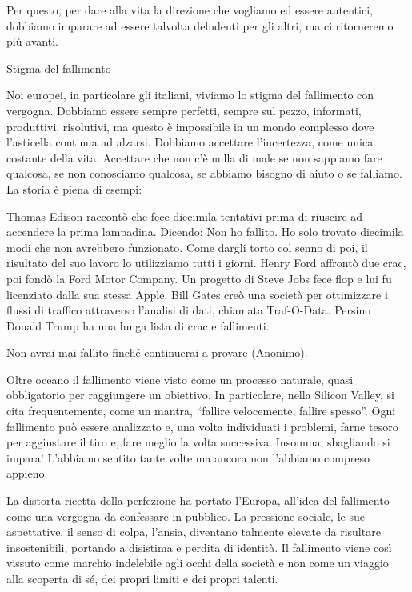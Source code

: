 \documentclass[12pt]{book} %
\begin{document}
Per questo, per dare alla vita la direzione che vogliamo ed essere autentici, dobbiamo imparare ad essere talvolta
deludenti per gli altri, ma ci ritorneremo più avanti.


\bigskip
\begin{mdframed}[linewidth=1pt]
Stigma del fallimento

Noi europei, in particolare gli italiani, viviamo lo stigma del fallimento con vergogna. Dobbiamo essere sempre
perfetti, sempre sul pezzo, informati, produttivi, risolutivi, ma questo è impossibile in un mondo complesso dove
l'asticella continua ad alzarsi. Dobbiamo accettare l'incertezza, come unica
costante della vita. Accettare che non c'è nulla di male se non sappiamo fare qualcosa, se non
conosciamo qualcosa, se abbiamo bisogno di aiuto o se falliamo. La storia è piena di esempi:

Thomas Edison raccontò che fece diecimila tentativi prima di riuscire ad accendere la prima lampadina. Dicendo: Non ho
fallito. Ho solo trovato diecimila modi che non avrebbero funzionato. Come dargli torto col senno di poi, il risultato
del suo lavoro lo utilizziamo tutti i giorni. Henry Ford affrontò due crac, poi fondò la Ford Motor Company. Un
progetto di Steve Jobs fece flop e lui fu licenziato dalla sua stessa Apple. Bill Gates creò una società per
ottimizzare i flussi di traffico attraverso l'analisi di dati, chiamata Traf-O-Data. Persino
Donald Trump ha una lunga lista di crac e
fallimenti.


\bigskip

Non avrai mai fallito finché continuerai a provare (Anonimo).


\bigskip

Oltre oceano il fallimento viene visto come un processo naturale, quasi obbligatorio per raggiungere un obiettivo. In
particolare, nella Silicon Valley, si cita frequentemente, come un mantra, “fallire velocemente, fallire spesso”. Ogni
fallimento può essere analizzato e, una volta individuati i problemi, farne tesoro per aggiustare il tiro e, fare
meglio la volta successiva. Insomma, sbagliando si impara! L'abbiamo sentito tante volte ma ancora
non l'abbiamo compreso appieno.


\bigskip

La distorta ricetta della perfezione ha portato l'Europa, all'idea del
fallimento come una vergogna da confessare in pubblico. La pressione sociale, le sue aspettative, il senso di colpa,
l'ansia, diventano talmente elevate da risultare insostenibili, portando a disistima e perdita di
identità. Il fallimento viene così vissuto come marchio indelebile agli occhi della società e non come un viaggio alla
scoperta di sé, dei propri limiti e dei propri talenti.


\end{mdframed}
\end{document}
